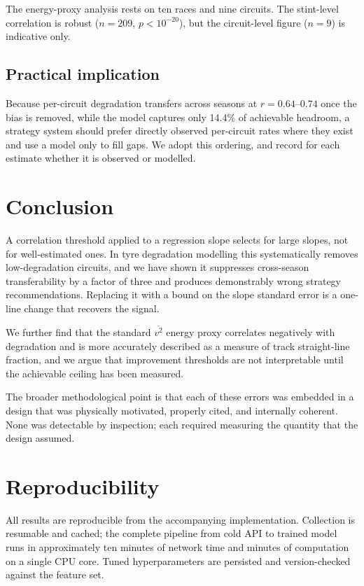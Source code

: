 \documentclass[conference]{IEEEtran}
\begin{document}
The energy-proxy analysis rests on ten races and nine circuits. The
stint-level correlation is robust ($n=209$, $p < 10^{-20}$), but the
circuit-level figure ($n=9$) is indicative only.

\subsection{Practical implication}

Because per-circuit degradation transfers across seasons at $r = 0.64$--$0.74$
once the bias is removed, while the model captures only 14.4\% of achievable
headroom, a strategy system should prefer directly observed per-circuit rates
where they exist and use a model only to fill gaps. We adopt this ordering, and
record for each estimate whether it is observed or modelled.

\section{Conclusion}

A correlation threshold applied to a regression slope selects for large slopes,
not for well-estimated ones. In tyre degradation modelling this systematically
removes low-degradation circuits, and we have shown it suppresses cross-season
transferability by a factor of three and produces demonstrably wrong strategy
recommendations. Replacing it with a bound on the slope standard error is a
one-line change that recovers the signal.

We further find that the standard $\overline{v^2}$ energy proxy correlates
negatively with degradation and is more accurately described as a measure of
track straight-line fraction, and we argue that improvement thresholds are not
interpretable until the achievable ceiling has been measured.

The broader methodological point is that each of these errors was embedded in
a design that was physically motivated, properly cited, and internally
coherent. None was detectable by inspection; each required measuring the
quantity that the design assumed.

\section*{Reproducibility}

All results are reproducible from the accompanying implementation. Collection
is resumable and cached; the complete pipeline from cold API to trained model
runs in approximately ten minutes of network time and minutes of computation on
a single CPU core. Tuned hyperparameters are persisted and version-checked
against the feature set.
\end{document}
